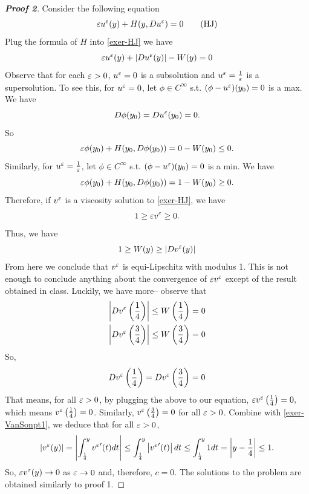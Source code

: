 \documentclass[12pt, oneside]{amsart}  	%
\begin{document}
\begin{proof}[\textbf{Proof 2}]
Consider the following equation
\begin{equation}\label{exer-HJ}
		\varepsilon u^\varepsilon(y) + H(y,Du^\varepsilon)=0 \tag{HJ}
\end{equation}
Plug the formula of $H$ into \eqref{exer-HJ} we have
\begin{equation*}
	 	\varepsilon u^\varepsilon(y)+ |Du^\varepsilon(y)|-W(y)=0
\end{equation*}
Observe that for each $\varepsilon>0$, $u^\varepsilon=0$ is a subsolution and $u^\varepsilon=\frac{1}{\varepsilon}$ is a supersolution. To see this, for $u^\varepsilon=0$, let $\phi\in C^\infty$ s.t. $(\phi-u^\varepsilon)(y_0)=0$ is a max. We have
$$D\phi(y_0)=Du^\varepsilon(y_0)=0.$$
So $$\varepsilon \phi(y_0) + H(y_0, D\phi(y_0))=0-W(y_0) \le 0.$$
Similarly, for $u^\varepsilon=\frac{1}{\varepsilon}$, let $\phi\in C^\infty$ s.t. $(\phi-u^\varepsilon)(y_0)=0$ is a min. We have
$$\varepsilon \phi(y_0) + H(y_0, D\phi(y_0))=1-W(y_0) \ge 0.$$
Therefore, if $v^\varepsilon$ is a viscosity solution to \eqref{exer-HJ}, we have
	 $$1\ge \varepsilon v^\varepsilon \ge 0.$$
Thus, we have
\begin{equation}\label{exer-VanSonpt1}
	 	1\ge W(y) \ge |Dv^\varepsilon(y)|
\end{equation}
From here we conclude that $v^\varepsilon$ is equi-Lipschitz with modulus 1. This is not enough to conclude anything about the convergence of $\varepsilon v^\varepsilon$ except of the result obtained in class. Luckily, we have more-- observe that
\begin{eqnarray*}
	 	\left|Dv^\varepsilon\left(\frac{1}{4}\right)\right| \le W\left(\frac{1}{4}\right) =0\\
	 	\left|Dv^\varepsilon\left(\frac{3}{4}\right)\right| \le W\left(\frac{3}{4}\right) =0\\
\end{eqnarray*}
So,
	 $$Dv^\varepsilon\left(\frac{1}{4}\right)=Dv^\varepsilon\left(\frac{3}{4}\right)=0$$
That means, for all $\varepsilon>0$, by plugging the above to our equation, $\varepsilon v^\varepsilon\left(\frac{1}{4}\right)=0,$ which means $v^\varepsilon\left(\frac{1}{4}\right)=0$. Similarly, $v^\varepsilon\left(\frac{3}{4}\right)=0$ for all $\varepsilon>0$. Combine with \eqref{exer-VanSonpt1}, we deduce that for all $\varepsilon>0$,
	 $$|v^\varepsilon(y)| = \left|\int_{\frac{1}{4}}^y {v^\varepsilon} '(t) dt\right| \le \int_{\frac{1}{4}}^y \left|{v^\varepsilon} '(t)\right| dt \le \int_{\frac{1}{4}}^y 1 dt =\left|y-\frac{1}{4}\right|\le 1.$$
So, $\varepsilon v^\varepsilon(y)\to 0$ as $\varepsilon\to 0$ and, therefore, $c=0$. The solutions to the problem are obtained similarly to proof 1.
\end{proof}
\vspace*{0.5cm}
\end{document}
